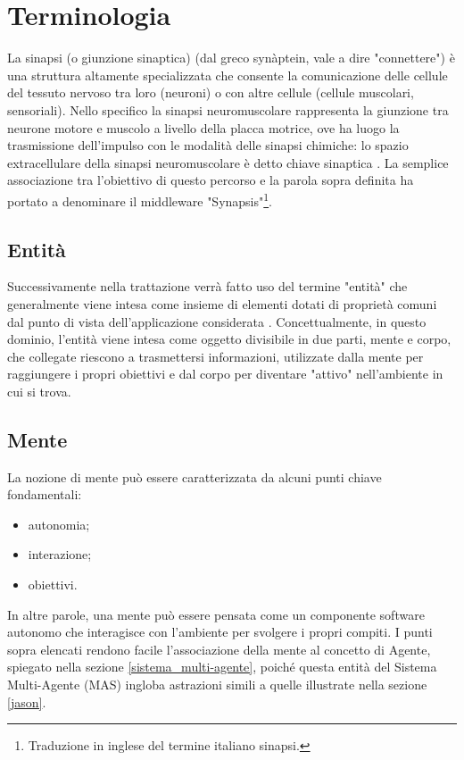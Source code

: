 \section{Terminologia}

La sinapsi (o giunzione sinaptica) (dal greco synàptein, vale a dire "connettere") è una struttura altamente specializzata che consente la comunicazione delle cellule del tessuto nervoso tra loro (neuroni) o con altre cellule (cellule muscolari, sensoriali). Nello specifico la sinapsi neuromuscolare rappresenta la giunzione tra neurone motore e muscolo a livello della placca motrice, ove ha luogo la trasmissione dell'impulso con le modalità delle sinapsi chimiche: lo spazio extracellulare della sinapsi neuromuscolare è detto chiave sinaptica \cite{treccani}.
La semplice associazione tra l'obiettivo di questo percorso e la parola sopra definita ha portato a denominare il middleware "Synapsis"\footnote{Traduzione in inglese del termine italiano sinapsi.}.

\subsection{Entità}

Successivamente nella trattazione verrà fatto uso del termine "entità" che generalmente viene intesa come insieme di elementi dotati di proprietà comuni dal punto di vista dell’applicazione considerata \cite{treccani}.
Concettualmente, in questo dominio, l'entità viene intesa come oggetto divisibile in due parti, mente e corpo, che collegate riescono a trasmettersi informazioni, utilizzate dalla mente per raggiungere i propri obiettivi e dal corpo per diventare "attivo" nell'ambiente in cui si trova.

\subsection{Mente}

La nozione di mente può essere caratterizzata da alcuni punti chiave fondamentali:
\begin{itemize}
   \item autonomia;
   \item interazione;
   \item obiettivi.
\end{itemize}
In altre parole, una mente può essere pensata come un componente software autonomo che interagisce con l'ambiente per svolgere i propri compiti.
I punti sopra elencati rendono facile l'associazione della mente al concetto di Agente, spiegato nella sezione \ref{sistema_multi-agente}, poiché questa entità del Sistema Multi-Agente (MAS) ingloba astrazioni simili a quelle illustrate nella sezione \ref{jason}.

